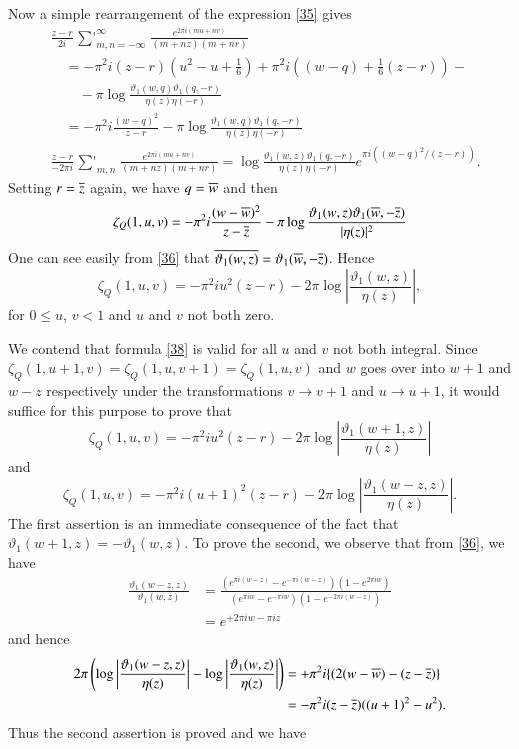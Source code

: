 Now a simple rearrangement of the expression \eqref{35} gives
\begin{align*}
& \frac{z-r}{2i}\mathop{{\sum}'}^{\infty}_{m,n=-\infty}\frac{e^{2\pi
    i(mu+nv)}}{(m+nz)(m+nr)}\\
&\quad
  =-\pi^{2}i(z-r)\left(u^{2}-u+\frac{1}{6}\right)+\pi^{2}i\left((w-q)+\frac{1}{6}(z-r)\right)-\\
&\qquad -\pi
  \log\frac{\vartheta_{1}(w,q)\vartheta_{1}(q,-r)}{\eta(z)\eta(-r)}\\
&\quad = -\pi^{2}i\frac{(w-q)^{2}}{z-r}-\pi
  \log\frac{\vartheta_{1}(w,q)\vartheta_{1}(q,-r)}{\eta(z)\eta(-r)}\\
&\frac{z-r}{-2\pi i}\mathop{{\sum}'}_{m,n}\frac{e^{2\pi
      i(mu+nv)}}{(m+nz)(m+nr)}=\log
  \frac{\vartheta_{1}(w,z)\vartheta_{1}(q,-r)}{\eta(z)\eta(-r)}e^{\pi i((w-q)^{2}/(z-r))}.\tag{37}\label{37}
\end{align*}\pageoriginale
Setting $r=\overline{z}$ again, we have $q=\overline{w}$ and then
$$
\zeta_{Q}(1,u,v)=-\pi^{2}i\frac{(w-\overline{w})^{2}}{z-\overline{z}}-\pi
\log\frac{\vartheta_{1}(w,z)\vartheta_{1}(\overline{w},-\overline{z})}{|\eta(z)|^{2}}
$$
One can see easily from \eqref{36} that
$\overline{\vartheta_{1}(w,z)}=\vartheta_{1}(\overline{w},-\overline{z})$. Hence
\begin{equation*}
\zeta_{Q}(1,u,v)=-\pi^{2}iu^{2}(z-r)-2\pi
\log\left|\frac{\vartheta_{1}(w,z)}{\eta(z)}\right|,\tag{38}\label{38} 
\end{equation*}
for $0\leq u$, $v<1$ and $u$ and $v$ not both zero.

We contend that formula \eqref{38} is valid for all $u$ and $v$ not
both integral. Since
$\zeta_{Q}(1,u+1,v)=\zeta_{Q}(1,u,v+1)=\zeta_{Q}(1,u,v)$ and $w$ goes
over into $w+1$ and $w-z$ respectively under the transformations $v\to
v+1$ and $u\to u+1$, it would suffice for this purpose to prove that
$$
\zeta_{Q}(1,u,v)=-\pi^{2}iu^{2}(z-r)-2\pi
\log\left|\frac{\vartheta_{1}(w+1,z)}{\eta(z)}\right|
$$
and
$$
\zeta_{Q}(1,u,v)=-\pi^{2}i(u+1)^{2}(z-r)-2\pi \log
\left|\frac{\vartheta_{1}(w-z,z)}{\eta(z)}\right|. 
$$
The first assertion is an immediate consequence of the fact that
$\vartheta_{1}(w+1,z)=-\vartheta_{1}(w,z)$. To prove the second, we
observe that from \eqref{36}, we have 
\begin{align*}
\frac{\vartheta_{1}(w-z,z)}{\vartheta_{1}(w,z)} &= \frac{(e^{\pi i(w-z)}-e^{-\pi i(w-z)})(1-e^{2\pi iw})}{(e^{\pi iw}-e^{-\pi iw})(1-e^{-2\pi i(w-z)})}\\
&= e^{+2\pi iw-\pi iz}
\end{align*}\pageoriginale
and hence
\begin{align*}
2\pi\left(\log\left|\frac{\vartheta_{1}(w-z,z)}{\eta(z)}\right|-\log\left|\frac{\vartheta_{1}(w,z)}{\eta(z)}\right|\right) &= +\pi^{2}i\{(2(w-\overline{w})-(z-\overline{z})\}\\
&= -\pi^{2}i(z-\overline{z})((u+1)^{2}-u^{2}).
\end{align*}
Thus the second assertion is proved and we have

